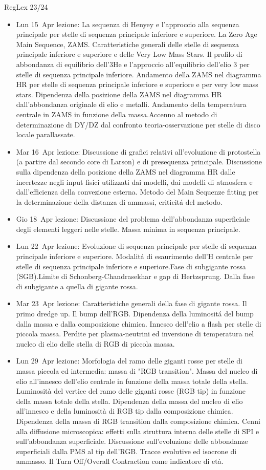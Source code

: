 \begin{frame}[allowframebreaks]{RegLex 23/24}
\begin{itemize}
\item Lun 15 Apr lezione: La sequenza di Henyey e l'approccio alla sequenza principale per stelle di sequenza principale inferiore e superiore. La Zero Age Main Sequence, ZAMS. Caratteristiche generali delle stelle di sequenza principale inferiore e superiore e delle Very Low Mass Stars. Il profilo di abbondanza di equilibrio dell'3He e l'approccio all'equilibrio dell'elio 3 per stelle di sequenza principale inferiore. Andamento della ZAMS nel diagramma HR per stelle di sequenza principale inferiore e superiore e per very low mass stars. Dipendenza della posizione della ZAMS nel diagramma HR dall'abbondanza originale di elio e metalli. Andamento della temperatura centrale in ZAMS in funzione della massa.Accenno al metodo di determinazione di DY/DZ dal confronto teoria-osservazione per stelle di disco locale parallassate. 
\item Mar 16 Apr lezione: Discussione di grafici relativi all'evoluzione di protostella (a partire dal secondo core di Larson) e di presequenza principale. Discussione sulla dipendenza della posizione della ZAMS nel diagramma HR dalle incertezze negli input fisici utilizzati dai modelli, dai modelli di atmosfera e dall'efficienza della convezione esterna. Metodo del Main Sequenze fitting per la determinazione della distanza di ammassi, criticit\'a del metodo. 
\item Gio 18 Apr lezione: Discussione del problema dell'abbondanza superficiale degli elementi leggeri nelle stelle. Massa minima in sequenza principale. 
\item Lun 22 Apr lezione: Evoluzione di sequenza principale per stelle di sequenza principale inferiore e superiore. Modalit\'a di esaurimento dell'H centrale per stelle di sequenza principale inferiore e superiore.Fase di subgigante rossa (SGB).Limite di Schonberg-Chandrasekhar e gap di Hertzsprung. Dalla fase di subgigante a quella di gigante rossa. 
\item Mar 23 Apr lezione: Caratteristiche generali della fase di gigante rossa. Il primo dredge up. Il bump dell'RGB. Dipendenza della luminosit\'a del bump dalla massa e dalla composizione chimica. Innesco dell'elio a flash per stelle di piccola massa. Perdite per plasma-neutrini ed inversione di temperatura nel nucleo di elio delle stella di RGB di piccola massa. 
\item Lun 29 Apr lezione: Morfologia del ramo delle giganti rosse per stelle di massa piccola ed intermedia: massa di "RGB transition". Massa del nucleo di elio all'innesco dell'elio centrale in funzione della massa totale della stella. Luminosità del vertice del ramo delle giganti rosse (RGB tip) in funzione della massa totale della stella. Dipendenza della massa del nucleo di elio all'innesco e della luminosità di RGB tip dalla composizione chimica. Dipendenza della massa di RGB transition dalla composizione chimica. Cenni alla diffusione microscopica: effetti sulla struttura interna delle stelle di SPI e sull'abbondanza superficiale. Discussione sull'evoluzione delle abbondanze superficiali dalla PMS al tip dell'RGB. Tracce evolutive ed isocrone di ammasso. Il Turn Off/Overall Contraction come indicatore di età. 

\end{itemize}
\end{frame}
